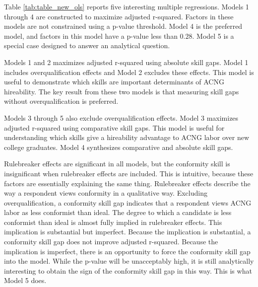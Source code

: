 \documentclass[review]{elsarticle}
\begin{document}






Table \ref{tab:table_new_ols} reports five interesting multiple regressions.
Models 1 through 4 are constructed to maximize adjusted r-squared.
Factors in these models are not constrained using a p-value threshold.
Model 4 is the preferred model, and factors in this model have a p-value less than $0.28$.
Model 5 is a special case designed to answer an analytical question.

Models 1 and 2 maximizes adjusted r-squared using absolute skill gaps.
Model 1 includes overqualification effects and Model 2 excludes these effects.
This model is useful to demonstrate which skills are important determinants of ACNG hireability.
The key result from these two models is that measuring skill gaps without overqualification is preferred.

Models 3 through 5 also exclude overqualification effects.
Model 3 maximizes adjusted r-squared using comparative skill gaps.
This model is useful for understanding which skills give a hireability advantage to ACNG labor over new college graduates.
Model 4 synthesizes comparative and absolute skill gaps.



Rulebreaker effects are significant in all models,
but the conformity skill is insignificant when rulebreaker effects are included.
This is intuitive, because these factors are essentially explaining the same thing.
Rulebreaker effects describe the way a respondent views conformity in a qualitative way.
Excluding overqualification, a conformity skill gap indicates that a respondent views ACNG labor as less conformist than ideal.
The degree to which a candidate is less conformist than ideal is almost fully implied in rulebreaker effects.
This implication is substantial but imperfect.
Because the implication is substantial, a conformity skill gap does not improve adjusted r-squared.
Because the implication is imperfect, there is an opportunity to force the conformity skill gap into the model.
While the p-value will be unacceptably high, it is still analytically interesting to obtain the sign of the conformity skill gap in this way.
This is what Model 5 does.
\end{document}
